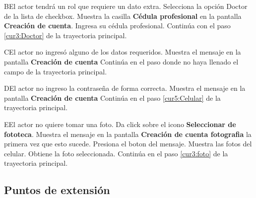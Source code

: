  \begin{UCtrayectoriaA}{B}{El actor tendrá un rol que requiere un dato extra.}
 	\UCpaso [\UCactor] Selecciona la opción Doctor de la lista de checkbox.
 	\UCpaso Muestra la casilla \textbf{Cédula profesional} en la pantalla \textbf{Creación de cuenta}.
 	\UCpaso [\UCactor] Ingresa su cédula profesional.
 	\UCpaso Continúa con el paso \ref{cur3:Doctor} de la trayectoria principal.
 	
   
 \end{UCtrayectoriaA}
 
\begin{UCtrayectoriaA}{C}{El actor no ingresó alguno de los datos requeridos.}
	\UCpaso[\UCsist] Muestra el mensaje  en la pantalla \textbf{Creación de cuenta}
	\UCpaso[] Continúa en el paso donde no haya llenado el campo de la trayectoria principal.
\end{UCtrayectoriaA}

\begin{UCtrayectoriaA}{D}{El actor no ingreso la contraseña de forma correcta.}
	\UCpaso[\UCsist] Muestra el mensaje  en la pantalla \textbf{Creación de cuenta}
	\UCpaso[] Continúa en el paso \ref{cur5:Celular} de la trayectoria principal.
\end{UCtrayectoriaA}

\begin{UCtrayectoriaA}{E}{El actor no quiere tomar una foto.}
	\UCpaso [\UCactor] Da click sobre el icono \textbf{Seleccionar de fototeca}.
	\UCpaso Muestra el mensaje  en la pantalla \textbf{Creación de cuenta fotografia} la primera vez que esto sucede.
	\UCpaso [\UCactor] Presiona el boton  del mensaje.
	\UCpaso Muestra las fotos del celular.
	\UCpaso Obtiene la foto seleccionada.
	\UCpaso Continúa en el paso \ref{cur3:foto} de la trayectoria principal.
	
\end{UCtrayectoriaA}
 
\subsection{Puntos de extensión}

 

